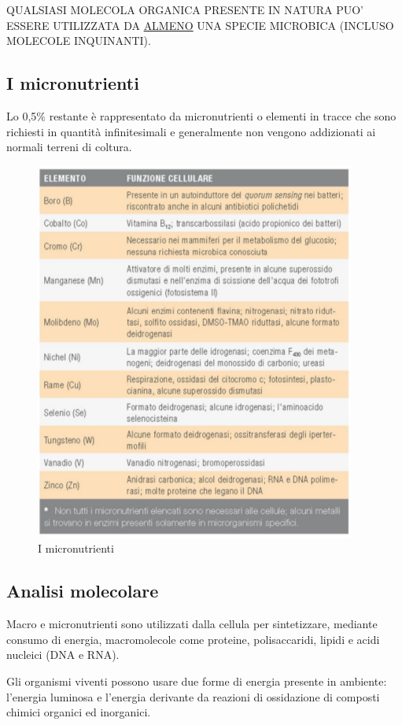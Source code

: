\documentclass[11pt]{book}
\begin{document}
QUALSIASI MOLECOLA ORGANICA PRESENTE IN NATURA PUO’ ESSERE UTILIZZATA DA \underline{ALMENO} UNA SPECIE MICROBICA (INCLUSO MOLECOLE INQUINANTI).


\subsection{I micronutrienti}
Lo 0,5$\%$ restante è rappresentato da micronutrienti o elementi in tracce che sono richiesti in quantità infinitesimali e generalmente non vengono addizionati ai normali terreni di coltura.

\clearpage
\begin{figure}[htp]
\centering
\includegraphics[scale=0.5]{img/Micronutrienti.png}
\caption{I micronutrienti}
\label{}
\end{figure}


\subsection{Analisi molecolare}
Macro e micronutrienti sono utilizzati dalla cellula per sintetizzare, mediante consumo di energia, macromolecole come proteine, polisaccaridi, lipidi e acidi nucleici (DNA e RNA).

Gli organismi viventi possono usare due forme di energia presente in ambiente: l’energia luminosa e l’energia derivante da reazioni di ossidazione di composti chimici organici ed inorganici.
\end{document}

